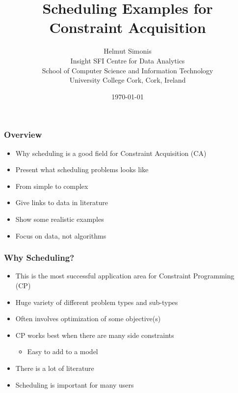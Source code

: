 \documentclass[dvipsnames,aspectratio=169]{beamer}
\title{Scheduling Examples for Constraint Acquisition}
\author{Helmut Simonis\\Insight SFI Centre for Data Analytics\\School of Computer Science and Information Technology\\University College Cork, Cork, Ireland}
\date{\today}
\begin{document}
\begin{frame}[plain]
  \titlepage
\end{frame}

\begin{frame}
\frametitle{Overview}
\begin{itemize}
\item Why scheduling is a good field for Constraint Acquisition (CA)
\item Present what scheduling problems looks like
\item From simple to complex
\item Give links to data in literature
\item Show some realistic examples
\item Focus on data, not algorithms
\end{itemize}
\end{frame}

\begin{frame}
\frametitle{Why Scheduling?}
\begin{itemize}
\item This is the most successful application area for Constraint Programming (CP)
\item Huge variety of different problem types and sub-types
\item Often involves optimization of some objective(s)
\item CP works best when there are many side constraints
\begin{itemize}
\item Easy to add to a model
\end{itemize}
\item There is a lot of literature
\item Scheduling is important for many users 
\end{itemize}
\end{frame}
\end{document}
